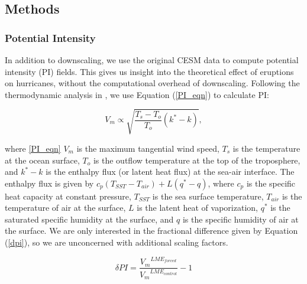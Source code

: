 \documentclass[smallextended]{svjour3}       %
\begin{document}
\subsection{Methods}
\subsubsection{Potential Intensity}
In addition to downscaling, we use the original CESM data to compute potential intensity (PI) fields. This gives us insight into the theoretical effect of eruptions on hurricanes, without the computational overhead of downscaling. Following the thermodynamic analysis in \cite{pi_ke}, we use Equation (\ref{PI_eqn}) to calculate PI:

\begin{equation}
{V_m} \propto \sqrt{\frac{T_s-T_{o}}{T_{o}}(k^{*}-k)},
\label{PI_eqn}
\end{equation}

where \ref{PI_eqn} $V_m$ is the maximum tangential wind speed, $T_s$ is the temperature at the ocean surface, $T_o$ is the outflow temperature at the top of the troposphere, and $k^{*}-k$ is the enthalpy flux (or latent heat flux) at the sea-air interface. The enthalpy flux is given by $c_p(T_{SST}-T_{air})+L(q^{*}-q)$, where $c_p$ is the specific heat capacity at constant pressure, $T_{SST}$ is the sea surface temperature, $T_{air}$ is the temperature of air at the surface, $L$ is the latent heat of vaporization, $q^{*}$ is the saturated specific humidity at the surface, and $q$ is the specific humidity of air at the surface. We are only interested in the fractional difference given by Equation (\ref{dpi}), so we are unconcerned with additional scaling factors.

\begin{equation}
\delta PI = \frac{{V_{m}}^{LME_{forced}}}{{V_{m}}^{LME_{control}}}-1
\label{dpi}
\end{equation}
\end{document}
